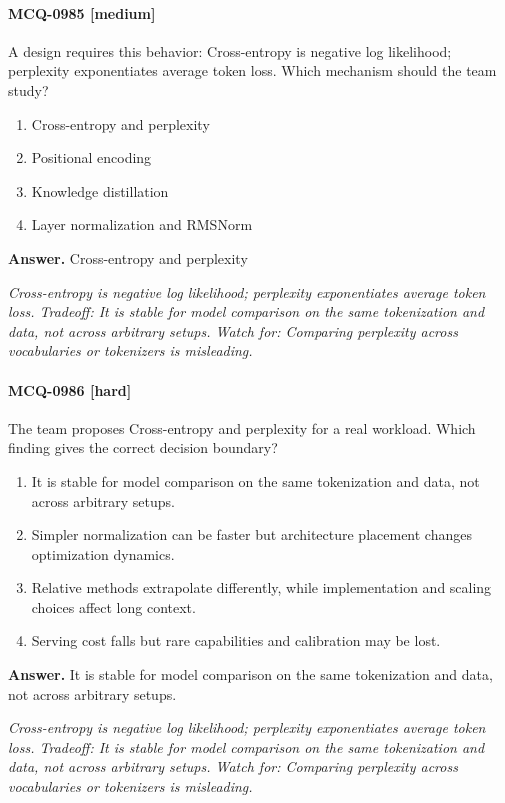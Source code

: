 \paragraph{MCQ-0985 [medium]} A design requires this behavior: Cross-entropy is negative log likelihood; perplexity exponentiates average token loss. Which mechanism should the team study?
\begin{enumerate}[label=\Alph*.]
\item Cross-entropy and perplexity
\item Positional encoding
\item Knowledge distillation
\item Layer normalization and RMSNorm
\end{enumerate}
\noindent\textbf{Answer.} Cross-entropy and perplexity
\par\textit{Cross-entropy is negative log likelihood; perplexity exponentiates average token loss. Tradeoff: It is stable for model comparison on the same tokenization and data, not across arbitrary setups. Watch for: Comparing perplexity across vocabularies or tokenizers is misleading.}
\paragraph{MCQ-0986 [hard]} The team proposes Cross-entropy and perplexity for a real workload. Which finding gives the correct decision boundary?
\begin{enumerate}[label=\Alph*.]
\item It is stable for model comparison on the same tokenization and data, not across arbitrary setups.
\item Simpler normalization can be faster but architecture placement changes optimization dynamics.
\item Relative methods extrapolate differently, while implementation and scaling choices affect long context.
\item Serving cost falls but rare capabilities and calibration may be lost.
\end{enumerate}
\noindent\textbf{Answer.} It is stable for model comparison on the same tokenization and data, not across arbitrary setups.
\par\textit{Cross-entropy is negative log likelihood; perplexity exponentiates average token loss. Tradeoff: It is stable for model comparison on the same tokenization and data, not across arbitrary setups. Watch for: Comparing perplexity across vocabularies or tokenizers is misleading.}
